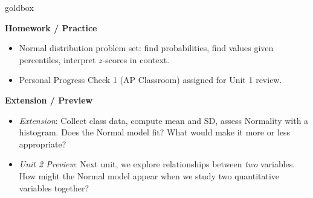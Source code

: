 \documentclass[10pt]{article}
\begin{document}
\begin{skillbox}{goldbox}
\begin{minipage}[t]{0.48\linewidth}
    \textbf{Homework / Practice}
    \begin{itemize}
        \item Normal distribution problem set: find probabilities, find values given percentiles, interpret $z$-scores in context.
        \item Personal Progress Check 1 (AP Classroom) assigned for Unit 1 review.
    \end{itemize}
\end{minipage}
\hfill
\begin{minipage}[t]{0.48\linewidth}
    \textbf{Extension / Preview}
    \begin{itemize}
        \item \textit{Extension}: Collect class data, compute mean and SD, assess Normality with a histogram. Does the Normal model fit? What would make it more or less appropriate?
        \item \textit{Unit 2 Preview}: Next unit, we explore relationships between \textit{two} variables. How might the Normal model appear when we study two quantitative variables together?
    \end{itemize}
\end{minipage}
\end{skillbox}
\end{document}
